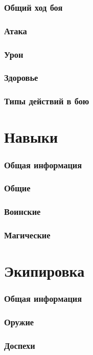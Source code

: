 \documentclass[10pt,twoside,twocolumn,openany]{book}
\begin{document}
\section{Общий ход боя}
\lipsum[1]
\section{Атака}
\lipsum[1]
\section{Урон}
\lipsum[1]
\section{Здоровье}
\lipsum[1]
\section{Типы действий в бою}
\lipsum[1]

\part{Навыки}
\section{Общая информация}
\lipsum[1]
\section{Общие}
\lipsum[1]
\section{Воинские}
\lipsum[1]
\section{Магические}
\lipsum[1]

\part{Экипировка}
\section{Общая информация}
\lipsum[1]
\section{Оружие}
\lipsum[1]
\section{Доспехи}
\lipsum[1]
\end{document}
